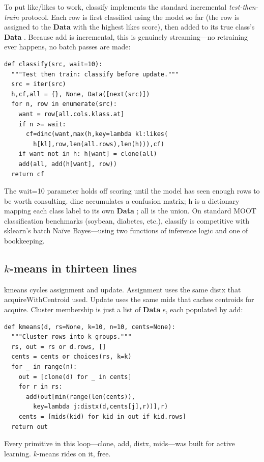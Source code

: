 \documentclass[AMA,STIX2COL]{WileyNJDv5}
\newcommand{\cls}[1]{%
  \setlength{\fboxsep}{1.5pt}%
  \colorbox{clsbg}{\sffamily\bfseries{#1}}%
}
\begin{document}
{To put \textsf{like}/\textsf{likes} to work, \textsf{classify}
implements the standard incremental {\em test-then-train} protocol.
Each row is first classified using the model so far (the row is
assigned to the \cls{Data} with the highest \textsf{likes} score),
then added to its true class's \cls{Data}. Because \textsf{add} is
incremental, this is genuinely streaming---no retraining ever
happens, no batch passes are made:
\begin{verbatim}
def classify(src, wait=10):
  """Test then train: classify before update."""
  src = iter(src)
  h,cf,all = {}, None, Data([next(src)])
  for n, row in enumerate(src):
    want = row[all.cols.klass.at]
    if n >= wait:
      cf=dinc(want,max(h,key=lambda kl:likes(
        h[kl],row,len(all.rows),len(h))),cf)
    if want not in h: h[want] = clone(all)
    add(all, add(h[want], row))
  return cf
\end{verbatim}
The \textsf{wait=10} parameter holds off scoring until the model
has seen enough rows to be worth consulting. \textsf{dinc}
accumulates a confusion matrix; \textsf{h} is a dictionary mapping
each class label to its own \cls{Data}; \textsf{all} is the union.
On standard MOOT classification benchmarks (soybean, diabetes,
etc.), \textsf{classify} is competitive with sklearn's batch Na\"ive
Bayes---using two functions of inference logic and one of
bookkeeping.

\subsection*{$k$-means in thirteen lines}

\textsf{kmeans} cycles assignment and update. Assignment uses the
same \textsf{distx} that \textsf{acquireWithCentroid} used. Update
uses the same \textsf{mids} that caches centroids for
\textsf{acquire}. Cluster membership is just a list of \cls{Data}s,
each populated by \textsf{add}:
\begin{verbatim}
def kmeans(d, rs=None, k=10, n=10, cents=None):
  """Cluster rows into k groups."""
  rs, out = rs or d.rows, []
  cents = cents or choices(rs, k=k)
  for _ in range(n):
    out = [clone(d) for _ in cents]
    for r in rs:
      add(out[min(range(len(cents)),
        key=lambda j:distx(d,cents[j],r))],r)
    cents = [mids(kid) for kid in out if kid.rows]
  return out
\end{verbatim}
Every primitive in this loop---\textsf{clone}, \textsf{add},
\textsf{distx}, \textsf{mids}---was built for active learning.
$k$-means rides on it, free.

}
\end{document}
